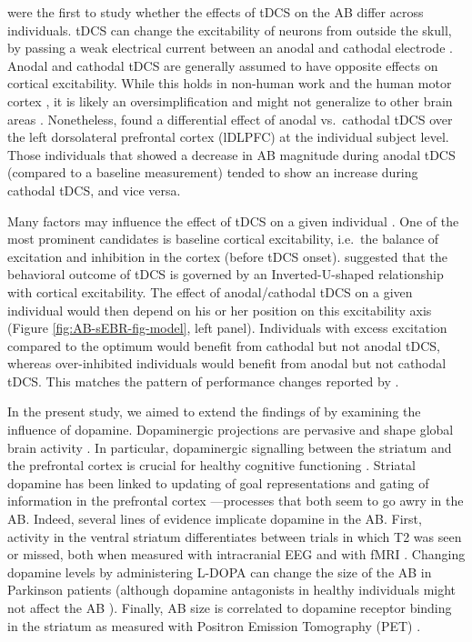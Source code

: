 \documentclass[11pt,]{memoir}
\begin{document}
\textcite{London2015} were the first to study whether the effects of tDCS on the AB differ across individuals. tDCS can change the excitability of neurons from outside the skull, by passing a weak electrical current between an anodal and cathodal electrode \autocite{Gebodh2019a}. Anodal and cathodal tDCS are generally assumed to have opposite effects on cortical excitability. While this holds in non-human work \autocites{Purpura1965}{Bindman1964} and the human motor cortex \autocites{Nitsche2000}{Nitsche2001}, it is likely an oversimplification \autocite{Liu2018} and might not generalize to other brain areas \autocites{Bestmann2014}{Parkin2015}. Nonetheless, \textcite{London2015} found a differential effect of anodal vs.~cathodal tDCS over the left dorsolateral prefrontal cortex (lDLPFC) at the individual subject level. Those individuals that showed a decrease in AB magnitude during anodal tDCS (compared to a baseline measurement) tended to show an increase during cathodal tDCS, and vice versa.

Many factors may influence the effect of tDCS on a given individual \autocites{Krause2014}{Li2015b}. One of the most prominent candidates is baseline cortical excitability, i.e.~the balance of excitation and inhibition in the cortex (before tDCS onset). \textcite{Krause2013} suggested that the behavioral outcome of tDCS is governed by an Inverted-U-shaped relationship with cortical excitability. The effect of anodal/cathodal tDCS on a given individual would then depend on his or her position on this excitability axis (Figure \ref{fig:AB-sEBR-fig-model}, left panel). Individuals with excess excitation compared to the optimum would benefit from cathodal but not anodal tDCS, whereas over-inhibited individuals would benefit from anodal but not cathodal tDCS. This matches the pattern of performance changes reported by \textcite{London2015}.

In the present study, we aimed to extend the findings of \textcite{London2015} by examining the influence of dopamine. Dopaminergic projections are pervasive and shape global brain activity \autocites{Schultz2007}{Bjorklund2007}. In particular, dopaminergic signalling between the striatum and the prefrontal cortex is crucial for healthy cognitive functioning \autocites{Nieoullon2002}{Robbins2009}. Striatal dopamine has been linked to updating of goal representations and gating of information in the prefrontal cortex \autocites{Cohen2004}{Cools2011}---processes that both seem to go awry in the AB. Indeed, several lines of evidence implicate dopamine in the AB. First, activity in the ventral striatum differentiates between trials in which T2 was seen or missed, both when measured with intracranial EEG \autocite{Slagter2017} and with fMRI \autocite{Slagter2010}. Changing dopamine levels by administering L-DOPA can change the size of the AB in Parkinson patients \autocite{Slagter2016a} (although dopamine antagonists in healthy individuals might not affect the AB \autocite{Gibbs2007}). Finally, AB size is correlated to dopamine receptor binding in the striatum as measured with Positron Emission Tomography (PET) \autocite{Slagter2012}.
\end{document}
